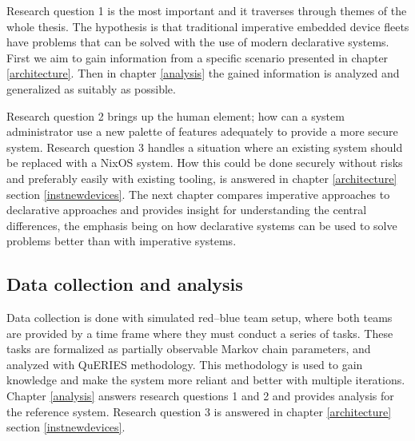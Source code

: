 Research question 1 is the most important and it traverses through
themes of the whole thesis. The hypothesis is that traditional
imperative embedded device fleets have problems that can be solved
with the use of modern declarative systems. First we aim to gain
information from a specific scenario presented in chapter
\ref{architecture}. Then in chapter \ref{analysis} the gained
information is analyzed and generalized as suitably as possible.

Research question 2 brings up the human element; how can a system
administrator use a new palette of features adequately to provide a more
secure system. Research question 3 handles a situation where
an existing system should be replaced with a NixOS system. How this could
be done securely without risks and preferably easily with existing
tooling, is answered in chapter \ref{architecture} section
\ref{instnewdevices}. The next chapter compares imperative approaches
to declarative approaches and provides insight for understanding the
central differences, the emphasis being on how declarative systems can be
used to solve problems better than with imperative systems.

\subsection{Data collection and analysis}

Data collection is done with simulated red–blue team setup, where both
teams are provided by a time frame where they must conduct a series of
tasks. These tasks are formalized as partially observable Markov chain
parameters, and analyzed with QuERIES methodology. This methodology is
used to gain knowledge and make the system more reliant and better
with multiple iterations. Chapter \ref{analysis} answers research
questions 1 and 2 and provides analysis for the reference
system. Research question 3 is answered in chapter \ref{architecture}
section \ref{instnewdevices}.
